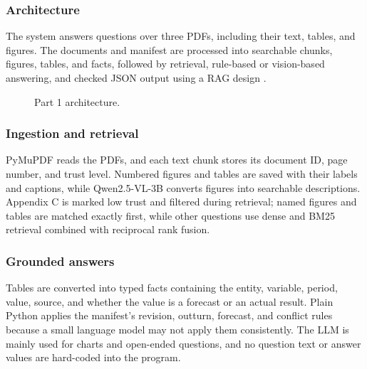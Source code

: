 \subsubsection{Architecture}
The system answers questions over three PDFs, including their text, tables, and figures. The documents and manifest are processed into searchable chunks, figures, tables, and facts, followed by retrieval, rule-based or vision-based answering, and checked JSON output using a RAG design \cite{lewis}.
\begin{figure}[!t]
\centering
{}
\caption{Part 1 architecture.}
\label{fig:p1}
\end{figure}

\subsubsection{Ingestion and retrieval}
PyMuPDF reads the PDFs, and each text chunk stores its document ID, page number, and trust level. Numbered figures and tables are saved with their labels and captions, while Qwen2.5-VL-3B converts figures into searchable descriptions. Appendix C is marked low trust and filtered during retrieval; named figures and tables are matched exactly first, while other questions use dense and BM25 retrieval combined with reciprocal rank fusion.

\subsubsection{Grounded answers}
Tables are converted into typed facts containing the entity, variable, period, value, source, and whether the value is a forecast or an actual result. Plain Python applies the manifest’s revision, outturn, forecast, and conflict rules because a small language model may not apply them consistently. The LLM is mainly used for charts and open-ended questions, and no question text or answer values are hard-coded into the program.

